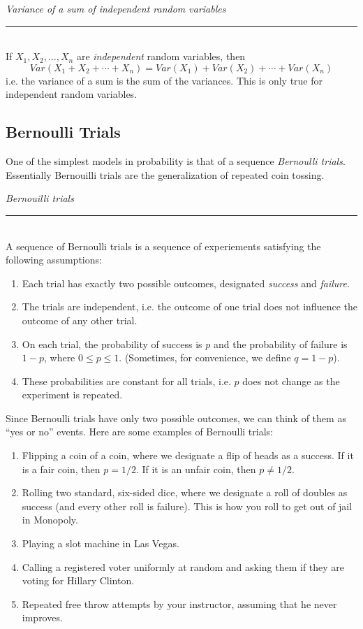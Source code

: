 \documentclass[12pt]{article}
\theoremstyle{definition}
\theoremstyle{remark}
\begin{document}
\begin{framed}
  \emph{Variance of a sum of independent random variables}\\
  \rule{\dimexpr{}\fboxrule}{.1pt} \\
If $X_1, X_2, \dots, X_n$ are \emph{independent} random variables, then
\[
Var(X_1 + X_2 + \cdots + X_n) = Var(X_1) + Var(X_2) + \cdots + Var(X_n)
\]
i.e. the variance of a sum is the sum of the variances. This is only true for independent random variables.
\end{framed}

\subsection{Bernoulli Trials}
One of the simplest models in probability is that of a sequence \emph{Bernoulli trials}. Essentially Bernouilli trials are the generalization of repeated coin tossing. 

\begin{framed}
  \emph{Bernouilli trials}\\
  \rule{\dimexpr{}\fboxrule}{.1pt} \\
A sequence of Bernoulli trials is a sequence of experiements satisfying the following assumptions:
\begin{enumerate}
\item Each trial has exactly two possible outcomes, designated \emph{success} and \emph{failure}.
\item The trials are independent, i.e. the outcome of one trial does not influence the outcome of any other trial.
\item On each trial, the probability of success is $p$ and the probability of failure is $1-p$, where $0 \leq p \leq 1$. (Sometimes, for convenience, we define $q = 1 - p$).
\item These probabilities are constant for all trials, i.e. $p$ does not change as the experiment is repeated.
\end{enumerate}
\end{framed}

Since Bernoulli trials have only two possible outcomes, we can think of them as ``yes or no'' events. Here are some examples of Bernoulli trials:
\begin{enumerate}
\item Flipping a coin of a coin, where we designate a flip of heads as a success. If it is a fair coin, then $p = 1/2$. If it is an unfair coin, then $p \neq 1/2$. 
\item Rolling two standard, six-sided dice, where we designate a roll of doubles as success (and every other roll is failure). This is how you roll to get out of jail in Monopoly.
\item Playing a slot machine in Las Vegas.
\item Calling a registered voter uniformly at random and asking them if they are voting for Hillary Clinton.
\item Repeated free throw attempts by your instructor, assuming that he never improves.
\end{enumerate}
\end{document}
